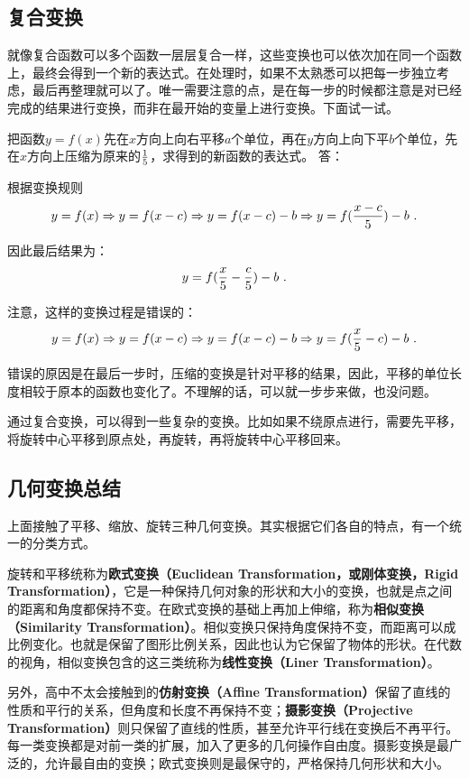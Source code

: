 \subsection{复合变换}

就像复合函数可以多个函数一层层复合一样，这些变换也可以依次加在同一个函数上，最终会得到一个新的表达式。在处理时，如果不太熟悉可以把每一步独立考虑，最后再整理就可以了。唯一需要注意的点，是在每一步的时候都注意是对已经完成的结果进行变换，而非在最开始的变量上进行变换。下面试一试。

\begin{exercise}{把函数$y=f(x)$先在$x$方向上向右平移$a$个单位，再在$y$方向上向下平$b$个单位，先在$x$方向上压缩为原来的$1\over5$，求得到的新函数的表达式。}
答：

根据变换规则
$$\displaystyle y=f(x)\Rightarrow y=f(x-c)\Rightarrow y=f(x-c)-b\Rightarrow y=f({{x-c}\over 5})-b~.$$

因此最后结果为：
$$y=f({x\over 5}-{c\over5})-b~.$$

注意，这样的变换过程是错误的：
$$\displaystyle y=f(x)\Rightarrow y=f(x-c)\Rightarrow y=f(x-c)-b\Rightarrow y=f({x\over 5}-c)-b~.$$

错误的原因是在最后一步时，压缩的变换是针对平移的结果，因此，平移的单位长度相较于原本的函数也变化了。不理解的话，可以就一步步来做，也没问题。

\end{exercise}

通过复合变换，可以得到一些复杂的变换。比如如果不绕原点进行，需要先平移，将旋转中心平移到原点处，再旋转，再将旋转中心平移回来。

\subsection{几何变换总结}

上面接触了平移、缩放、旋转三种几何变换。其实根据它们各自的特点，有一个统一的分类方式。

旋转和平移统称为\textbf{欧式变换（Euclidean Transformation，或刚体变换，Rigid Transformation）}，它是一种保持几何对象的形状和大小的变换，也就是点之间的距离和角度都保持不变。在欧式变换的基础上再加上伸缩，称为\textbf{相似变换（Similarity Transformation）}。相似变换只保持角度保持不变，而距离可以成比例变化。也就是保留了图形比例关系，因此也认为它保留了物体的形状。在代数的视角，相似变换包含的这三类统称为\textbf{线性变换（Liner Transformation）}。

另外，高中不太会接触到的\textbf{仿射变换（Affine Transformation）}保留了直线的性质和平行的关系，但角度和长度不再保持不变；\textbf{摄影变换（Projective Transformation）}则只保留了直线的性质，甚至允许平行线在变换后不再平行。每一类变换都是对前一类的扩展，加入了更多的几何操作自由度。摄影变换是最广泛的，允许最自由的变换；欧式变换则是最保守的，严格保持几何形状和大小。

